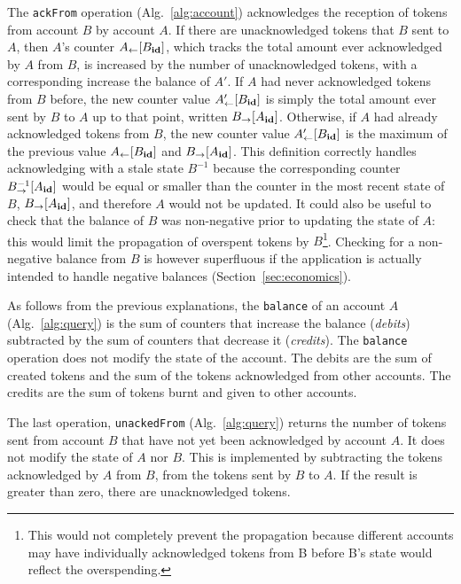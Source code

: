 \documentclass[9pt, oneside]{article}   	%
\begin{document}
The \texttt{ackFrom} operation (Alg.~\ref{alg:account}) acknowledges the reception of tokens from account $B$ by account $A$. If there are unacknowledged tokens that $B$ sent to $A$,
then $A$'s counter $A_{\leftarrow}[B_{\scriptsize \textbf{id}}]$, which tracks the total amount ever acknowledged by $A$ from $B$, is increased by the number of unacknowledged tokens, with a corresponding increase the balance of $A'$. If $A$ had never acknowledged tokens from $B$ before, the new counter value  $A'_{\leftarrow}[B_{\scriptsize \textbf{id}}]$ is simply the total amount ever sent by $B$ to $A$ up to that point, written $B_{\rightarrow}[A_{\scriptsize \textbf{id}}]$. Otherwise, if $A$ had already acknowledged tokens from $B$, the new counter value  $A'_{\leftarrow}[B_{\scriptsize \textbf{id}}]$ is the maximum of the previous value $A_{\leftarrow}[B_{\scriptsize \textbf{id}}]$ and $B_{\rightarrow}[A_{\scriptsize \textbf{id}}]$. This definition correctly handles acknowledging with a stale state  $B^{-1}$ because the corresponding counter $B^{-1}_{\rightarrow}[A_{\scriptsize \textbf{id}}]$ would be equal or smaller than the counter in the most recent state of $B$, $B_{\rightarrow}[A_{\scriptsize \textbf{id}}]$, and therefore $A$ would not be updated. It could also be useful to check that the balance of $B$ was non-negative prior to updating the state of $A$: this would limit the propagation of overspent tokens by $B$\footnote{ This would not completely prevent the propagation because different accounts may have individually acknowledged tokens from B before B's state would reflect the overspending.}. Checking for a non-negative balance from $B$ is however superfluous if the application is actually intended to handle negative balances (Section~\ref{sec:economics}).

As follows from the previous explanations, the \texttt{balance} of an account $A$ (Alg.~\ref{alg:query}) is the sum of counters that increase the balance (\textit{debits}) subtracted by the sum of counters that decrease it (\textit{credits}). The \texttt{balance} operation does not modify the state of the account. The debits are the sum of created tokens and the sum of the tokens acknowledged from other accounts. The credits are the sum of tokens burnt and given to other accounts.

The last operation, \texttt{unackedFrom} (Alg.~\ref{alg:query})  returns the number of tokens sent from account $B$ that have not yet been acknowledged by account $A$. It does not modify the state of $A$ nor $B$. This is implemented by subtracting the tokens acknowledged by $A$ from $B$, from the tokens sent by $B$ to $A$. If the result is greater than zero, there are unacknowledged tokens.
\end{document}
